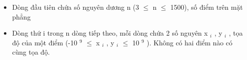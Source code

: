 \begin{itemize}
	\item     Dòng đầu tiên chứa số nguyên dương n (3 $\le$ n $\le$ 1500), số điểm trên mặt phẳng   
	\item     Dòng thứ i trong n dòng tiếp theo, mỗi dòng chứa 2 số nguyên x    $_     i    $    , y    $_     i    $    , tọa độ của một điểm (-10    $^     9    $     $\le$ x    $_     i    $    , y    $_     i    $     $\le$  10    $^     9    $    ). Không có hai điểm nào có cùng tọa độ.   
\end{itemize}